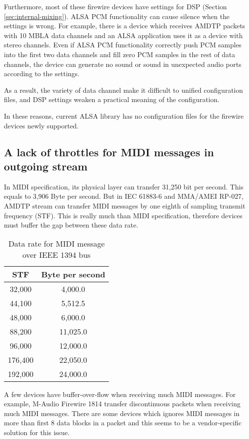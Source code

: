 \documentclass[onecolumn]{article}
\begin{document}
Furthermore, most of these firewire devices have settings for DSP (Section \ref{sec:internal-mixing}). ALSA PCM functionality can cause silence when the settings is wrong. For example, there is a device which receives AMDTP packets with 10 MBLA data channels and an ALSA application uses it as a device with stereo channels. Even if ALSA PCM functionality correctly push PCM samples into the first two data channels and fill zero PCM samples in the rest of data channels, the device can generate no sound or sound in unexpected audio ports according to the settings.

As a result, the variety of data channel make it difficult to unified configuration files, and DSP settings weaken a practical meaning of the configuration.

In these reasons, current ALSA library has no configuration files for the firewire devices newly supported.

\subsection{A lack of throttles for MIDI messages in outgoing stream}
In MIDI specification, its physical layer can transfer 31,250 bit per second. This equals to 3,906 Byte per second. But in IEC 61883-6\cite{iec61883-6-1, iec61883-6-2} and MMA/AMEI RP-027\cite{amei-rp27}, AMDTP stream can transfer MIDI messages by one eighth of sampling transmit frequency (STF). This is really much than MIDI specification, therefore devices must buffer the gap between these data rate.

\begin{table}[H]
	\centering
	\caption{{Data rate for MIDI message over IEEE 1394 bus}}
	\label{tbl:midi-rate}
	\begin{tabular}{cc} \toprule
		STF	& Byte per second \\ \midrule
		32,000	& 4,000.0	\\
		44,100	& 5,512.5	\\
		48,000	& 6,000.0	\\
		88,200	& 11,025.0	\\
		96,000	& 12,000.0	\\
		176,400	& 22,050.0	\\
		192,000	& 24,000.0	\\ \bottomrule
	\end{tabular}
\end{table}

A few devices have buffer-over-flow when receiving much MIDI messages. For example, M-Audio Firewire 1814 transfer discontinuous packets when receiving much MIDI messages. There are some devices which ignores MIDI messages in more than first 8 data blocks in a packet and this seems to be a vendor-specific solution for this issue.
\end{document}
